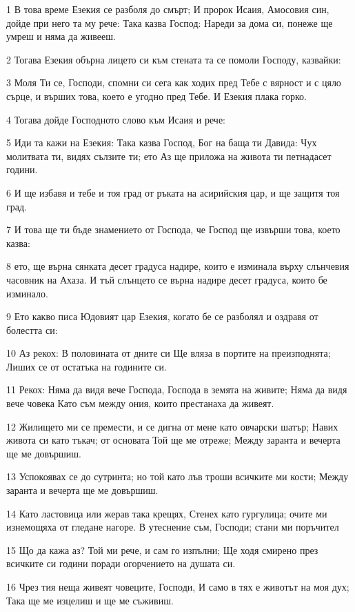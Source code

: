 \par 1 В това време Езекия се разболя до смърт; И пророк Исаия, Амосовия син, дойде при него та му рече: Така казва Господ: Нареди за дома си, понеже ще умреш и няма да живееш.
\par 2 Тогава Езекия обърна лицето си към стената та се помоли Господу, казвайки:
\par 3 Моля Ти се, Господи, спомни си сега как ходих пред Тебе с вярност и с цяло сърце, и върших това, което е угодно пред Тебе. И Езекия плака горко.
\par 4 Тогава дойде Господното слово към Исаия и рече:
\par 5 Иди та кажи на Езекия: Така казва Господ, Бог на баща ти Давида: Чух молитвата ти, видях сълзите ти; ето Аз ще приложа на живота ти петнадасет години.
\par 6 И ще избавя и тебе и тоя град от ръката на асирийския цар, и ще защитя тоя град.
\par 7 И това ще ти бъде знамението от Господа, че Господ ще извърши това, което казва:
\par 8 ето, ще върна сянката десет градуса надире, които е изминала върху слънчевия часовник на Ахаза. И тъй слънцето се върна надире десет градуса, които бе изминало.
\par 9 Ето какво писа Юдовият цар Езекия, когато бе се разболял и оздравя от болестта си:
\par 10 Аз рекох: В половината от дните си Ще вляза в портите на преизподнята; Лиших се от остатъка на годините си.
\par 11 Рекох: Няма да видя вече Господа, Господа в земята на живите; Няма да видя вече човека Като съм между ония, които престанаха да живеят.
\par 12 Жилището ми се премести, и се дигна от мене като овчарски шатър; Навих живота си като тъкач; от основата Той ще ме отреже; Между заранта и вечерта ще ме довършиш.
\par 13 Успокоявах се до сутринта; но той като лъв троши всичките ми кости; Между заранта и вечерта ще ме довършиш.
\par 14 Като ластовица или жерав така крещях, Стенех като гургулица; очите ми изнемощяха от гледане нагоре. В утеснение съм, Господи; стани ми поръчител
\par 15 Що да кажа аз? Той ми рече, и сам го изпълни; Ще ходя смирено през всичките си години поради огорчението на душата си.
\par 16 Чрез тия неща живеят човеците, Господи, И само в тях е животът на моя дух; Така ще ме изцелиш и ще ме съживиш.
